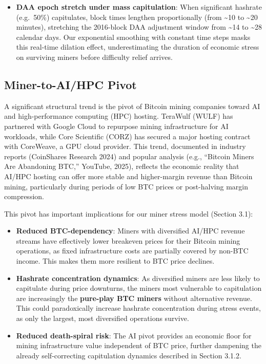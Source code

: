 \documentclass[
  11pt,
]{article}
\providecommand{\tightlist}{%
  \setlength{\itemsep}{0pt}\setlength{\parskip}{0pt}}\usepackage{longtable,booktabs,array}
\let\oldsubsection\subsection
\renewcommand{\subsection}[1]{\FloatBarrier\oldsubsection{#1}}
\begin{document}
\begin{itemize}
  over-the-counter (OTC) block desks and CME Bitcoin futures to buffer
  large redemptions, which would further dampen the transient temporary
  impact component. Our spot-only assumption therefore represents a
  conservative upper bound on market disruption.
\item
  \textbf{DAA epoch stretch under mass capitulation}: When significant
  hashrate (e.g.~50\%) capitulates, block times lengthen proportionally
  (from \textasciitilde10 to \textasciitilde20 minutes), stretching the
  2016-block DAA adjustment window from \textasciitilde14 to
  \textasciitilde28 calendar days. Our exponential smoothing with
  constant time steps masks this real-time dilation effect,
  underestimating the duration of economic stress on surviving miners
  before difficulty relief arrives.
\end{itemize}

\hypertarget{miner-to-aihpc-pivot}{%
\subsection{Miner-to-AI/HPC Pivot}\label{miner-to-aihpc-pivot}}

A significant structural trend is the pivot of Bitcoin mining companies
toward AI and high-performance computing (HPC) hosting. TeraWulf (WULF)
has partnered with Google Cloud to repurpose mining infrastructure for
AI workloads, while Core Scientific (CORZ) has secured a major hosting
contract with CoreWeave, a GPU cloud provider. This trend, documented in
industry reports (CoinShares Research 2024) and popular analysis (e.g.,
``Bitcoin Miners Are Abandoning BTC,'' YouTube, 2025), reflects the
economic reality that AI/HPC hosting can offer more stable and
higher-margin revenue than Bitcoin mining, particularly during periods
of low BTC prices or post-halving margin compression.

This pivot has important implications for our miner stress model
(Section 3.1):

\begin{itemize}
\tightlist
\item
  \textbf{Reduced BTC-dependency}: Miners with diversified AI/HPC
  revenue streams have effectively lower breakeven prices for their
  Bitcoin mining operations, as fixed infrastructure costs are partially
  covered by non-BTC income. This makes them more resilient to BTC price
  declines.
\item
  \textbf{Hashrate concentration dynamics}: As diversified miners are
  less likely to capitulate during price downturns, the miners most
  vulnerable to capitulation are increasingly the \textbf{pure-play BTC
  miners} without alternative revenue. This could paradoxically increase
  hashrate concentration during stress events, as only the largest, most
  diversified operations survive.
\item
  \textbf{Reduced death-spiral risk}: The AI pivot provides an economic
  floor for mining infrastructure value independent of BTC price,
  further dampening the already self-correcting capitulation dynamics
  described in Section 3.1.2.
\end{itemize}
\end{document}

